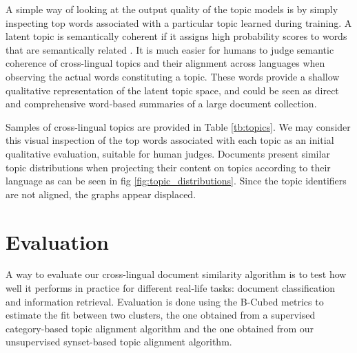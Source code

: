 A simple way of looking at the output quality of the topic models is by simply inspecting top words associated with a particular topic learned during training. A latent topic is semantically coherent if it assigns high probability scores to words that are semantically related \citep{Gliozzo2007, newman-etal-2010-automatic, mimno-etal-2011-optimizing}. It is much easier for humans to judge semantic coherence of cross-lingual topics and their alignment across languages when observing the actual words constituting a topic. These words provide a shallow qualitative representation of the latent topic space, and could be seen as direct and comprehensive word-based summaries of a large document collection.

Samples of cross-lingual topics are provided in Table \ref{tb:topics}. We may consider this visual inspection of the top words associated with each topic as an initial qualitative evaluation, suitable for human judges. Documents present similar topic distributions when projecting their content on topics according to their language as can be seen in fig \ref{fig:topic_distributions}. Since the topic identifiers are not aligned, the graphs appear displaced.

\section{Evaluation}
\label{sec:crosslingual-evaluation}

A way to evaluate our cross-lingual document similarity algorithm is to test how well it performs in practice for different real-life tasks: document classification and information retrieval. Evaluation is done using the B-Cubed metrics \citep{Bagga1998} to estimate the fit between two clusters, the one obtained from a supervised category-based topic alignment algorithm and the one obtained from our unsupervised synset-based topic alignment algorithm. 

